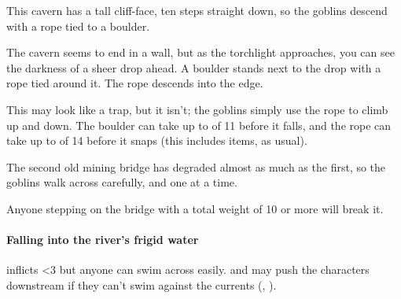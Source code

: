 \begin{multicols}{2}

\begin{exampletext}
  This cavern has a tall cliff-face, ten \glspl{step} straight down, so the goblins descend with a rope tied to a boulder.
\end{exampletext}

\begin{boxtext}
  The cavern seems to end in a wall, but as the torchlight approaches, you can see the darkness of a sheer drop ahead.
  A boulder stands next to the drop with a rope tied around it.
  The rope descends into the edge.
\end{boxtext}

This may look like a trap, but it isn't; the goblins simply use the rope to climb up and down.
The boulder can take up to  of 11 before it falls, and the rope can take up to  of 14 before it snaps (this includes items, as usual).




\begin{exampletext}
  The second old mining bridge has degraded almost as much as the first, so the goblins walk across carefully, and one at a time.
\end{exampletext}

Anyone stepping on the bridge with a total \gls{weight} of 10 or more will break it.

\paragraph{Falling into the river's frigid water}
inflicts 
\ifnum\value{temperature}<3%
  but anyone can swim across easily.
\else%
  and may push the characters downstream if they can't swim against the currents (, \tn[5]).
\fi%





\end{multicols}
